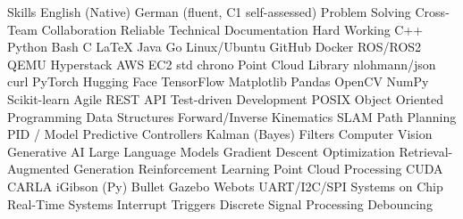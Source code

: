 
\begin{rubric}{Skills}
\entry*[Languages]
	\skilldotfirst English (Native) \skilldot German (fluent, C1 self-assessed)
\entry*[Strengths] 
	\skilldotfirst Problem Solving \skilldot Cross-Team Collaboration \skilldot Reliable \newline \skilldotfirst Technical Documentation \skilldot Hard Working %
\entry*[Coding]
	\skilldotfirst C++ \skilldot Python \skilldot Bash \skilldot C \skilldot LaTeX \skilldot Java \skilldot Go
\entry*[Software] 
	\skilldotfirst Linux/Ubuntu \skilldot GitHub \skilldot Docker \skilldot ROS/ROS2 \skilldot QEMU \newline \skilldotfirst Hyperstack \skilldot AWS EC2
 \entry*[Libraries (C++)] 
 	\skilldotfirst std \skilldot chrono \skilldot Point Cloud Library \skilldot nlohmann/json \skilldot curl
\entry*[Libraries (Py)] 
	\skilldotfirst PyTorch \skilldot Hugging Face \skilldot TensorFlow \skilldot Matplotlib \skilldot Pandas \newline \skilldot OpenCV \skilldot NumPy \skilldot Scikit-learn 
\entry*[Knowledge] 	
	\skilldotfirst Agile \skilldot REST API \skilldot Test-driven Development \skilldot POSIX  \newline \skilldotfirst Object Oriented Programming \skilldot Data Structures 
\entry*[Robotics]
	\skilldotfirst Forward/Inverse Kinematics \skilldot SLAM \skilldot Path Planning \newline \skilldotfirst PID / Model Predictive Controllers \skilldot Kalman (Bayes) Filters
	\skilldotfirst Computer Vision \skilldot Generative AI \skilldot Large Language Models \newline \skilldotfirst Gradient Descent Optimization \skilldot Retrieval-Augmented Generation \newline \skilldotfirst Reinforcement Learning  \skilldot Point Cloud Processing \skilldot CUDA
\entry*[Simulators] 
	\skilldotfirst CARLA \skilldot iGibson \skilldot (Py) Bullet \skilldot Gazebo \skilldot Webots
\entry*[Microcontrollers]
	\skilldotfirst UART/I2C/SPI \skilldot Systems on Chip \skilldot Real-Time Systems \newline \skilldotfirst Interrupt Triggers \skilldot Discrete Signal Processing \skilldot Debouncing

\end{rubric}
